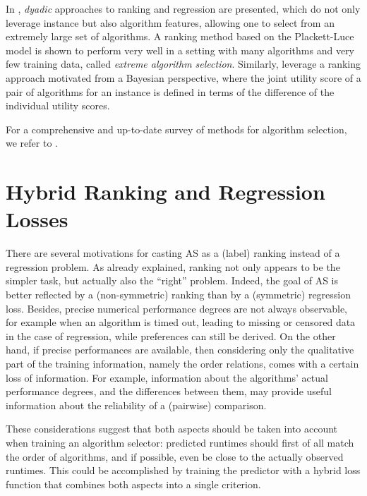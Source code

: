 \documentclass[runningheads]{llncs}
\begin{document}
In \cite{tornedeWHextreme20}, \emph{dyadic} approaches to ranking and regression are presented, which do not only leverage instance but also algorithm features, allowing one to select from an extremely large set of algorithms. A ranking method based on the Plackett-Luce model is shown to perform very well in a setting with many algorithms and very few training data, called \emph{extreme algorithm selection}.
Similarly, \cite{oentaryoHL15} leverage a ranking approach motivated  from a Bayesian perspective, where the joint utility score of a pair of algorithms for an instance is defined in terms of the difference of the individual utility scores.

For a comprehensive and up-to-date survey of methods for algorithm selection, we refer to \cite{kerschkeHNT19}. 

\section{Hybrid Ranking and Regression Losses}
\label{sec:hybrid_ranking_regression}

There are several motivations for casting AS as a (label) ranking instead of a regression problem. As already explained, ranking not only appears to be the simpler task, but actually also the ``right'' problem. Indeed, the goal of AS is better reflected by a (non-symmetric) ranking than by a (symmetric) regression loss. Besides, precise numerical performance degrees are not always observable, for example when an algorithm is timed out, leading to missing or censored data in the case of regression, while preferences can still be derived. 
On the other hand, if precise performances are available, then considering only the qualitative part of the training information, namely the order relations, comes with a certain loss of information. For example, information about the algorithms' actual performance degrees, and the differences between them, may provide useful information about the reliability of a (pairwise) comparison. 

These considerations suggest that both aspects should be taken into account when training an algorithm selector: predicted runtimes should first of all match the order of algorithms, and if possible, even be close to the actually observed runtimes. This could be accomplished by training the predictor with a hybrid loss function that combines both aspects into a single criterion.
\end{document}
